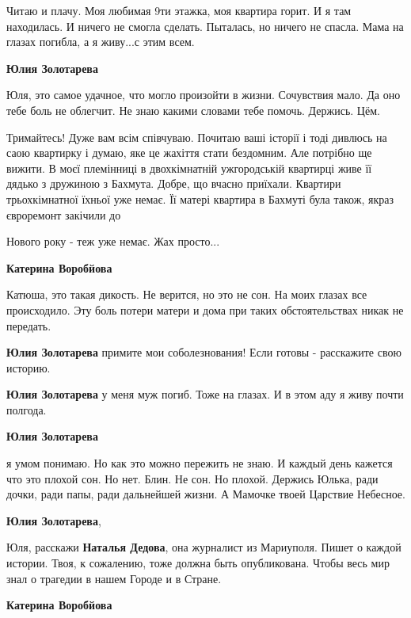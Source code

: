 
Читаю и плачу. Моя любимая 9ти этажка, моя квартира горит. И я там находилась.
И ничего не смогла сделать. Пыталась, но ничего не спасла. Мама на глазах
погибла, а я живу...с этим всем.

\begin{itemize} %
\textbf{Юлия Золотарева} 

Юля, это самое удачное, что могло произойти в жизни. Сочувствия мало. Да оно
тебе боль не облегчит. Не знаю какими словами тебе помочь. Держись. Цём.


Тримайтесь! Дуже вам всім співчуваю. Почитаю ваші історії і тоді дивлюсь на
саою квартирку і думаю, яке це жахіття стати бездомним. Але потрібно ще вижити.
В моєї племінниці в двохкімнатній ужгородській квартирці живе її дядько з
дружиною з Бахмута. Добре, що вчасно приїхали. Квартири трьохкімнатної їхньої
уже немає. Її матері квартира в Бахмуті була також, якраз євроремонт закічили
до

Нового року - теж уже немає. Жах просто...

\textbf{Катерина Воробйова} 

Катюша, это такая дикость. Не верится, но это не сон. На моих глазах все
происходило. Эту боль потери матери и дома при таких обстоятельствах никак не
передать.

\textbf{Юлия Золотарева} примите мои соболезнования!
Если готовы - расскажите свою историю. 🙏🇺🇦

\textbf{Юлия Золотарева} у меня муж погиб. Тоже на глазах. И в этом аду я живу почти полгода. 🥺

\textbf{Юлия Золотарева} 

я умом понимаю. Но как это можно пережить не знаю. И каждый день кажется что
это плохой сон. Но нет. Блин. Не сон. Но плохой. Держись Юлька, ради дочки,
ради папы, ради дальнейшей жизни. А Мамочке твоей Царствие Небесное.

\textbf{Юлия Золотарева}, 

Юля, расскажи \textbf{Наталья Дедова}, она журналист из Мариуполя. Пишет о
каждой истории. Твоя, к сожалению, тоже должна быть опубликована. Чтобы весь
мир знал о трагедии в нашем Городе и в Стране.

\textbf{Катерина Воробйова} 


\end{itemize}
